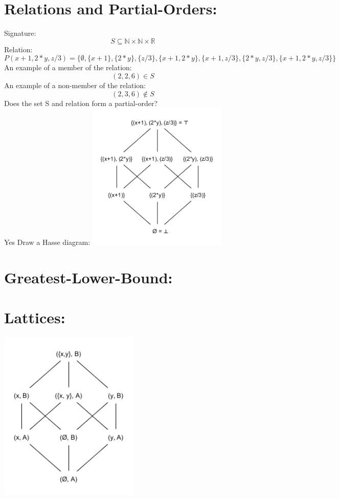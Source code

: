 \documentclass{article}
\begin{document}


\section*{Relations and Partial-Orders:}
Signature:
$$S\subseteq \mathbb{N} \times \mathbb{N} \times \mathbb{R}$$
Relation:
$$P({x+1, 2*y, z/3}) = \{\emptyset, \{x+1\}, \{2*y\}, \{z/3\}, \{x+1, 2*y\}, \{x+1, z/3\}, \{2*y, z/3\}, \{x+1, 2*y, z/3\}\}$$
An example of a member of the relation:
$$(2,2,6) \in S$$
An example of a non-member of the relation:
$$(2,3,6) \notin S$$
Does the set S and relation form a partial-order?\\
Yes
Draw a Hasse diagram:
\includegraphics[width=0.5\textwidth]{Hasse}


\section*{Greatest-Lower-Bound:}

\section*{Lattices:}
\includegraphics[width=0.5\textwidth]{Lattices}
\end{document}
